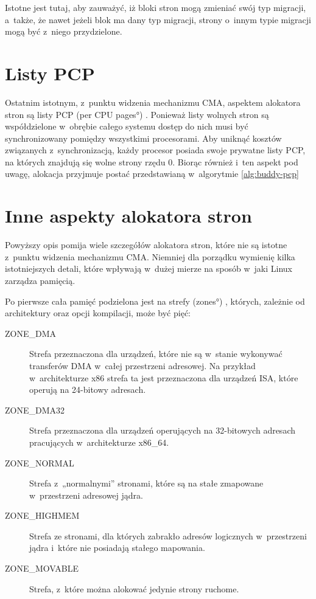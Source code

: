 Istotne jest tutaj, aby zauważyć, iż bloki stron mogą zmieniać swój
typ migracji, a~także, że nawet jeżeli blok ma dany typ migracji,
strony o~innym typie migracji mogą być z~niego przydzielone.


\section{Listy PCP}\label{sec:pcp-lists}

Ostatnim istotnym, z~punktu widzenia mechanizmu CMA, aspektem
alokatora stron są listy PCP (\ang{per CPU pages})
\autocite[podrozdział 8.1.8]{bib:utlk}.  Ponieważ listy wolnych stron
są współdzielone w~obrębie całego systemu dostęp do nich musi być
synchronizowany pomiędzy wszystkimi procesorami.  Aby uniknąć kosztów
związanych z~synchronizacją, każdy procesor posiada swoje prywatne
listy PCP, na których znajdują się wolne strony rzędu 0.  Biorąc
również i~ten aspekt pod uwagę, alokacja przyjmuje postać
przedstawianą w~algorytmie \ref{alg:buddy-pcp}

\section{Inne aspekty alokatora stron}

Powyższy opis pomija wiele szczegółów alokatora stron, które nie są
istotne z~punktu widzenia mechanizmu CMA.  Niemniej dla porządku
wymienię kilka istotniejszych detali, które wpływają w~dużej mierze na
sposób w~jaki Linux zarządza pamięcią.

Po pierwsze cała pamięć podzielona jest na strefy (\ang{zones})
\autocite[podrozdział 8.1.3]{bib:utlk}, których, zależnie od
architektury oraz opcji kompilacji, może być pięć:

\begin{description}
\item[ZONE\_DMA] Strefa przeznaczona dla urządzeń, które nie są
  w~stanie wykonywać transferów DMA w~całej przestrzeni adresowej.  Na
  przykład w~architekturze x86 strefa ta jest przeznaczona dla
  urządzeń ISA, które operują na 24-bitowy adresach.
\item[ZONE\_DMA32] Strefa przeznaczona dla urządzeń operujących
  na 32-bitowych adresach pracujących w~architekturze x86\_64.
\item[ZONE\_NORMAL] Strefa z~„normalnymi” stronami, które są na
  stałe zmapowane w~przestrzeni adresowej jądra.
\item[ZONE\_HIGHMEM] Strefa ze stronami, dla których zabrakło
  adresów logicznych w~przestrzeni jądra i~które nie posiadają stałego
  mapowania.
\item[ZONE\_MOVABLE] Strefa, z~które można alokować jedynie
  strony ruchome.
\end{description}

